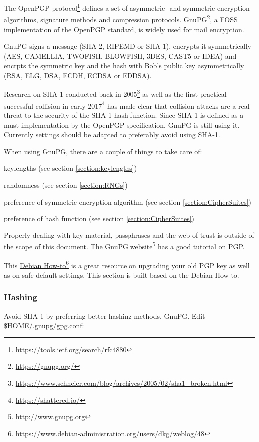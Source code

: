 \gdef\currentsectionname{GPG}
\gdef\currentsubsectionname{GnuPG}

The OpenPGP protocol\footnote{\url{https://tools.ietf.org/search/rfc4880}} defines a set of asymmetric- and symmetric encryption algorithms, signature methods and compression protocols. GnuPG\footnote{\url{https://gnupg.org/}}, a FOSS implementation of the OpenPGP standard, is widely used for mail encryption.
 
GnuPG signs a message (SHA-2, RIPEMD or SHA-1), encrypts it symmetrically (AES, CAMELLIA, TWOFISH, BLOWFISH, 3DES, CAST5 or IDEA) and encrpts the symmetric key and the hash with Bob's public key asymmetrically (RSA, ELG, DSA, ECDH, ECDSA or EDDSA).

Research on SHA-1 conducted back in 2005\footnote{\url{https://www.schneier.com/blog/archives/2005/02/sha1\_broken.html}} as well as the first practical successful collision in early 2017\footnote{\url{https://shattered.io/}} has made clear that collision attacks are a real threat to the security of the SHA-1 hash function. Since SHA-1 is defined as a must implementation by the OpenPGP specification, GnuPG is still using it. Currently settings should be adapted to preferably avoid using SHA-1. 

When using GnuPG, there are a couple of things to take care of:
\begin{itemize*}
  \item keylengths (see section \ref{section:keylengths})
  \item randomness (see section \ref{section:RNGs})
  \item preference of symmetric encryption algorithm (see section \ref{section:CipherSuites})
  \item preference of hash function (see section \ref{section:CipherSuites})
\end{itemize*}

Properly dealing with key material, passphrases and the web-of-trust is outside of the scope of this document. The GnuPG website\footnote{\url{http://www.gnupg.org}} has a good tutorial on PGP.

This \href{https://www.debian-administration.org/users/dkg/weblog/48}{Debian How-to}\footnote{\url{https://www.debian-administration.org/users/dkg/weblog/48}} is a great resource on upgrading your old PGP key as well as on safe default settings. This section is built based on the Debian How-to.

\subsubsection{Hashing}
Avoid SHA-1 by preferring better hashing methods. GnuPG. Edit \$HOME/.gnupg/gpg.conf:

